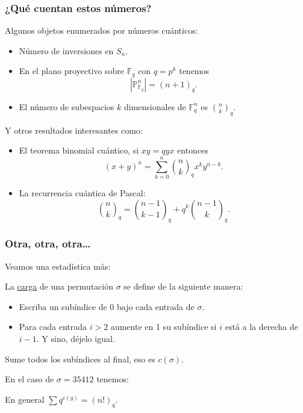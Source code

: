 \documentclass[grey]{beamer}
\newcommand{\sg}{\sigma}
\newcommand{\bF}{\mathbb{F}}
\newcommand{\bP}{\mathbb{P}}
\begin{document}
\begin{frame}[t]\frametitle{¿Qué cuentan estos números?}
  Algunos objetos enumerados por números cuánticos:
  \begin{itemize}[<+->]
    \item Número de inversiones en $S_n$.
    \item En el plano proyectivo sobre $\bF_q$ con $q=p^k$ tenemos 
    $$|\bP^n_{\bF_q}|=(n+1)_q.$$
    \item El número de subespacios $k$ dimensionales de $\bF_q^n$ es $\binom{n}{k}_q$. 
  \end{itemize}\pause
  Y otros resultados interesantes como:\pause
  \begin{itemize}[<+->]
    \item El teorema binomial cuántico, si $xy=qyx$ entonces 
    $$(x+y)^n=\sum_{k=0}^{n}\binom{n}{k}_qx^k y^{n-k}.$$
    \item La recurrencia cuántica de Pascal:
    $$\binom{n}{k}_q=\binom{n-1}{k-1}_q+q^k\binom{n-1}{k}_q.$$
  \end{itemize}
\end{frame}

\begin{frame}[t]\frametitle{Otra, otra, otra\dots}
  Veamos una estadística más:
  \begin{definition}
    La \underline{carga} de una permutación $\sg$ se define de la siguiente manera:
    \begin{itemize}
      \item Escriba un subíndice de 0 bajo cada entrada de $\sg$.
      \item Para cada entrada $i>2$ aumente en 1 su subíndice si $i$ está a la derecha de $i-1$. Y sino, déjelo igual.
    \end{itemize}
    Sume todos los subíndices al final, eso es $c(\sg)$.
  \end{definition}\pause
  En el caso de $\sg=35412$ tenemos:\par
  \vspace{5em}\pause
  En general $\sum q^{c(g)}=(n!)_q$.
\end{frame}

  
\end{document}
